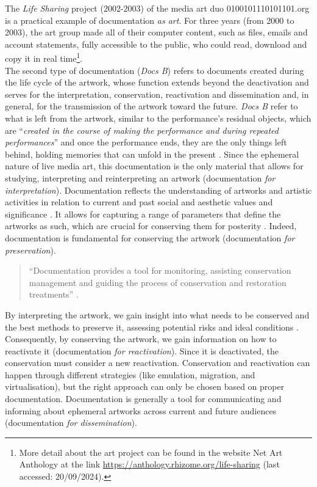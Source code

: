 The \textit{Life Sharing} project (2002-2003) of the media art duo 0100101110101101.org is a practical example of documentation \textit{as art}. For three years (from 2000 to 2003), the art group made all of their computer content, such as files, emails and account statements, fully accessible to the public, who could read, download and copy it in real time\footnote{More detail about the art project can be found in the website Net Art Anthology at the link \url{https://anthology.rhizome.org/life-sharing} (last accessed: 20/09/2024).}.\\
The second type of documentation (\textit{Docs B}) refers to documents created during the life cycle of the artwork, whose function extends beyond the deactivation and serves for the interpretation, conservation, reactivation and dissemination and, in general, for the transmission of the artwork toward the future. \textit{Docs B} refer to what is left from the artwork, similar to the performance’s residual objects, which are ``\textit{created in the course of making the performance and during repeated performances}'' \cite{holling2016aesthetics} and once the performance ends, they are the only things left behind, holding memories that can unfold in the present \cite{brignone2009so}. Since the ephemeral nature of live media art, this documentation is the only material that allows for studying, interpreting and reinterpreting an artwork (documentation \textit{for interpretation}). Documentation reflects the understanding of artworks and artistic activities in relation to current and past social and aesthetic values and significance \cite{heydenreich2011documentation:ch7}. It allows for capturing a range of parameters that define the artworks as such, which are crucial for conserving them for posterity \cite{giannachi2022use}. Indeed, documentation is fundamental for conserving the artwork (documentation \textit{for preservation}). 
\begin{quote}
“Documentation provides a tool for monitoring, assisting conservation management and guiding the process of conservation and restoration treatments” \cite{heydenreich2011documentation:ch7}.     
\end{quote}
By interpreting the artwork, we gain insight into what needs to be conserved and the best methods to preserve it, assessing potential risks and ideal conditions \cite{heydenreich2011documentation:ch7}. Consequently, by conserving the artwork, we gain information on how to reactivate it (documentation \textit{for reactivation}). Since it is deactivated, the conservation must consider a new reactivation. Conservation and reactivation can happen through different strategies (like emulation, migration, and virtualisation), but the right approach can only be chosen based on proper documentation. Documentation is generally a tool for communicating and informing about ephemeral artworks across current and future audiences (documentation \textit{for dissemination}).\\ 
